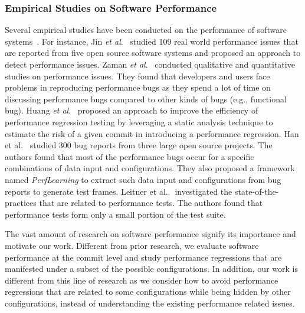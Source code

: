 \subsubsection{Empirical Studies on Software Performance}
Several empirical studies have been conducted on the performance of software systems~\cite{ICSE2014:Huang,Jin:2012,MSR11:Zaman,MSR12:Zaman,DBLP:conf/kbse/HanYL18,Leitner2017ICPE}. For instance, Jin \emph{et al$.$}~\cite{Jin:2012} studied 109 real world performance issues that are reported from five open source software systems and %
proposed an approach to detect performance issues. Zaman \emph{et al$.$}~\cite{MSR11:Zaman,MSR12:Zaman} conducted qualitative and quantitative studies on performance issues. They found that developers and users face problems in reproducing performance bugs %
as they spend %
a lot of time on discussing performance bugs %
compared to other kinds of bugs (e.g., functional bug). %
Huang \emph{et al$.$}~\cite{ICSE2014:Huang} %
proposed an approach to improve the efficiency of performance regression testing by leveraging a static analysis technique to estimate the risk of a given commit in introducing a performance regression. Han et al$.$~\cite{DBLP:conf/kbse/HanYL18} studied %
300 bug reports from three large open source projects. The authors found that most of the performance bugs occur for a specific combinations of data input and configurations. They also proposed a framework named \emph{PerfLearning} to extract such data input and configurations from bug reports to generate test frames. Leitner et al$.$~\cite{Leitner2017ICPE} %
investigated the state-of-the-practices that are related to performance tests. The authors found that performance tests form only a small portion of the test suite.

The vast amount of research on software performance signify its importance and motivate our work. %
Different from prior research, we evaluate software performance at the commit level and study performance regressions that are manifested under a subset of the possible configurations. %
In addition, our work is different from this line of research as we consider how to avoid performance regressions that are related to some configurations while being hidden by other configurations, instead of understanding the existing performance related issues. 


